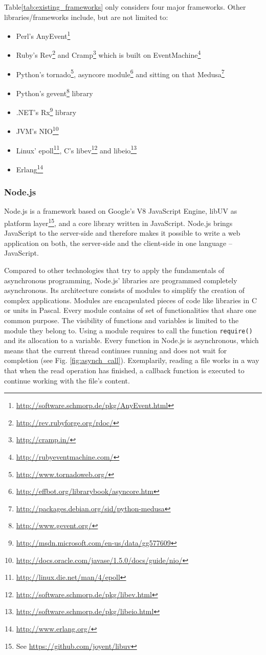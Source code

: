 \pagebreak
Table\ref{tab:existing_frameworks} only considers four major frameworks. Other libraries/frameworks include, but are not limited to:

\begin{itemize}
  \item Perl's AnyEvent\footnote{\url{http://software.schmorp.de/pkg/AnyEvent.html}}
  \item Ruby's Rev\footnote{\url{http://rev.rubyforge.org/rdoc/}} and Cramp\footnote{\url{http://cramp.in/}} which is built on EventMachine\footnote{\url{http://rubyeventmachine.com/}}
  \item Python's tornado\footnote{\url{http://www.tornadoweb.org/}}, asyncore module\footnote{\url{http://effbot.org/librarybook/asyncore.htm}} and sitting on that Medusa\footnote{\url{http://packages.debian.org/sid/python-medusa}}
  \item Python's gevent\footnote{\url{http://www.gevent.org/}} library
  \item .NET's Rx\footnote{\url{http://msdn.microsoft.com/en-us/data/gg577609}} library
  \item JVM's NIO\footnote{\url{http://docs.oracle.com/javase/1.5.0/docs/guide/nio/}}
  \item Linux' epoll\footnote{\url{http://linux.die.net/man/4/epoll}}, C's libev\footnote{\url{http://software.schmorp.de/pkg/libev.html}} and libeio\footnote{\url{http://software.schmorp.de/pkg/libeio.html}}
  \item Erlang\footnote{\url{http://www.erlang.org/}}
\end{itemize}

\FloatBarrier

\subsubsection{Node.js}
\label{Node.js}

Node.js is a framework based on Google's V8 JavaScript Engine, libUV as platform
layer\footnote{See \url{https://github.com/joyent/libuv}}, and a core library
written in JavaScript.
Node.js brings JavaScript to the server-side and therefore makes it possible to
write a web application on both, the server-side and the client-side in one
language – JavaScript.

Compared to other technologies that try to apply the fundamentals of
asynchronous programming, Node.js' libraries are programmed completely
asynchronous. Its architecture consists of modules to simplify the creation of
complex applications. Modules are encapsulated pieces of code like libraries in
C or units in Pascal. Every module contains of set of functionalities that share
one common purpose. The visibility of functions and variables is limited to the
module they belong to. Using a module requires to call the function \texttt{require()}
and its allocation to a variable.
Every function in Node.js is asynchronous, which means that the current thread
continues running and does not wait for completion (see Fig.
\ref{fig:asynch_call}). Exemplarily, reading a file works in a way that when the
read operation has finished, a callback function is executed to continue working
with the file's content.


